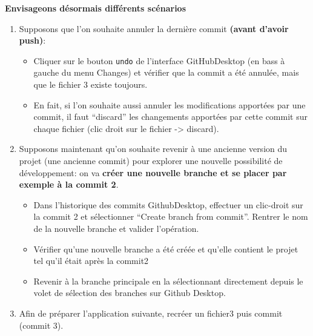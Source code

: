 \documentclass[
  letterpaper,
  DIV=11,
  numbers=noendperiod]{scrartcl}
\providecommand{\tightlist}{%
  \setlength{\itemsep}{0pt}\setlength{\parskip}{0pt}}\usepackage{longtable,booktabs,array}
\begin{document}
\begin{tcolorbox}[enhanced jigsaw, colframe=quarto-callout-tip-color-frame, rightrule=.15mm, breakable, colbacktitle=quarto-callout-tip-color!10!white, coltitle=black, toptitle=1mm, title={Revenir à des anciennes versions du code}, titlerule=0mm, leftrule=.75mm, colback=white, bottomrule=.15mm, bottomtitle=1mm, toprule=.15mm, opacitybacktitle=0.6, arc=.35mm, left=2mm, opacityback=0]

\textbf{Envisageons désormais différents scénarios}

\begin{enumerate}
\def\labelenumi{\arabic{enumi}.}
\tightlist
\item
  Supposons que l'on souhaite annuler la dernière commit \textbf{(avant
  d'avoir push)}:

  \begin{itemize}
  \tightlist
  \item
    Cliquer sur le bouton \texttt{undo} de l'interface GitHubDesktop (en
    bass à gauche du menu Changes) et vérifier que la commit a été
    annulée, mais que le fichier 3 existe toujours.
  \item
    En fait, si l'on souhaite aussi annuler les modifications apportées
    par une commit, il faut ``discard'' les changements apportées par
    cette commit sur chaque fichier (clic droit sur le fichier
    -\textgreater{} discard).
  \end{itemize}
\item
  Supposons maintenant qu'on souhaite revenir à une ancienne version du
  projet (une ancienne commit) pour explorer une nouvelle possibilité de
  développement: on va \textbf{créer une nouvelle branche et se placer
  par exemple à la commit 2}.

  \begin{itemize}
  \tightlist
  \item
    Dans l'historique des commits GithubDesktop, effectuer un clic-droit
    sur la commit 2 et sélectionner ``Create branch from commit''.
    Rentrer le nom de la nouvelle branche et valider l'opération.
  \item
    Vérifier qu'une nouvelle branche a été créée et qu'elle contient le
    projet tel qu'il était après la commit2
  \item
    Revenir à la branche principale en la sélectionnant directement
    depuis le volet de sélection des branches sur Github Desktop.
  \end{itemize}
\item
  Afin de préparer l'application suivante, recréer un fichier3 puis
  commit (commit 3).
\end{enumerate}

\end{tcolorbox}
\end{document}
